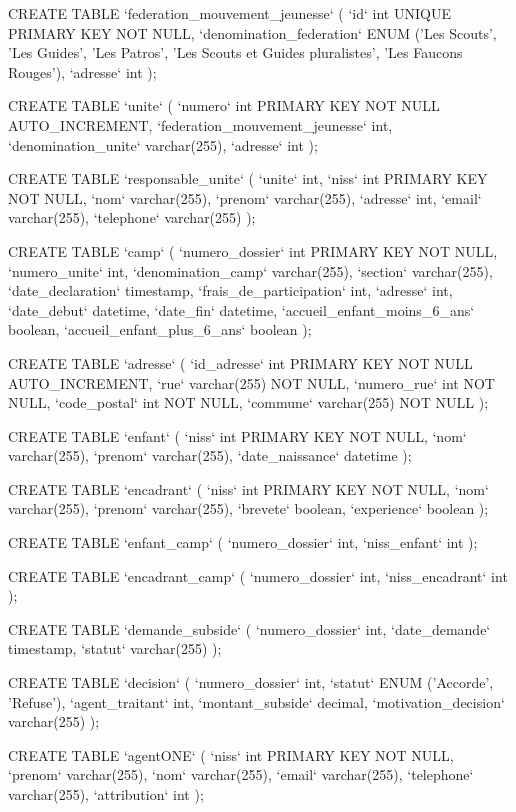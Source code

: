 CREATE TABLE `federation_mouvement_jeunesse` (
  `id` int UNIQUE PRIMARY KEY NOT NULL,
  `denomination_federation` ENUM ('Les Scouts', 'Les Guides', 'Les Patros', 'Les Scouts et Guides pluralistes', 'Les Faucons Rouges'),
  `adresse` int
);

CREATE TABLE `unite` (
  `numero` int PRIMARY KEY NOT NULL AUTO_INCREMENT,
  `federation_mouvement_jeunesse` int,
  `denomination_unite` varchar(255),
  `adresse` int
);

CREATE TABLE `responsable_unite` (
  `unite` int,
  `niss` int PRIMARY KEY NOT NULL,
  `nom` varchar(255),
  `prenom` varchar(255),
  `adresse` int,
  `email` varchar(255),
  `telephone` varchar(255)
);

CREATE TABLE `camp` (
  `numero_dossier` int PRIMARY KEY NOT NULL,
  `numero_unite` int,
  `denomination_camp` varchar(255),
  `section` varchar(255),
  `date_declaration` timestamp,
  `frais_de_participation` int,
  `adresse` int,
  `date_debut` datetime,
  `date_fin` datetime,
  `accueil_enfant_moins_6_ans` boolean,
  `accueil_enfant_plus_6_ans` boolean
);

CREATE TABLE `adresse` (
  `id_adresse` int PRIMARY KEY NOT NULL AUTO_INCREMENT,
  `rue` varchar(255) NOT NULL,
  `numero_rue` int NOT NULL,
  `code_postal` int NOT NULL,
  `commune` varchar(255) NOT NULL
);

CREATE TABLE `enfant` (
  `niss` int PRIMARY KEY NOT NULL,
  `nom` varchar(255),
  `prenom` varchar(255),
  `date_naissance` datetime
);

CREATE TABLE `encadrant` (
  `niss` int PRIMARY KEY NOT NULL,
  `nom` varchar(255),
  `prenom` varchar(255),
  `brevete` boolean,
  `experience` boolean
);

CREATE TABLE `enfant_camp` (
  `numero_dossier` int,
  `niss_enfant` int
);

CREATE TABLE `encadrant_camp` (
  `numero_dossier` int,
  `niss_encadrant` int
);

CREATE TABLE `demande_subside` (
  `numero_dossier` int,
  `date_demande` timestamp,
  `statut` varchar(255)
);

CREATE TABLE `decision` (
  `numero_dossier` int,
  `statut` ENUM ('Accorde', 'Refuse'),
  `agent_traitant` int,
  `montant_subside` decimal,
  `motivation_decision` varchar(255)
);

CREATE TABLE `agentONE` (
  `niss` int PRIMARY KEY NOT NULL,
  `prenom` varchar(255),
  `nom` varchar(255),
  `email` varchar(255),
  `telephone` varchar(255),
  `attribution` int
);


